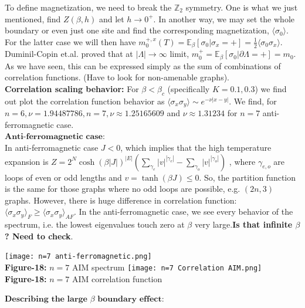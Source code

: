 \documentclass{article}
\begin{document}
	To define magnetization, we need to break the $\mathbb Z_2$ symmetry. One is what we just mentioned, find $Z(\beta,h)$ and let $h \to 0^{+}$. In another way, we may set the whole boundary or even just one site and find the corresponding magnetization, $\langle \sigma_0 \rangle$. For the latter case we will then have $m_0^{+,x}(T)=\mathbb{E_{\beta}}[\sigma_0 | \sigma_x=+]=\frac{1}{2}\langle \sigma_0 \sigma_x\rangle$. \\
	
	Duminil-Copin et.al. proved that at $|\Lambda| \to \infty$ limit, $m_0^{+}=\mathbb{E_{\beta}}[\sigma_0| \partial \Lambda=+]=m_0$. As we have seen, this can be expressed simply as the sum of combinations of correlation functions. (Have to look for non-amenable graphs).\\
	
	\textbf{Correlation scaling behavior:} For $\beta<\beta_c$ (specifically $K=0.1,0.3$) we find out plot the correlation function behavior as $\langle \sigma_x \sigma_y\rangle \sim e^{-\nu|x-y|}$. We find, for $n=6, \nu=1.94487786, n=7, \nu \approx 1.25165609$ and $\nu \approx 1.31234$ for $n=7$ anti-ferromagnetic case. \\
	
	
	$\textbf{Anti-ferromagnetic case:}$\\
	
	 In anti-ferromagnetic case $J<0$, which implies that the high temperature expansion is $Z=2^N\cosh(\beta |J|)^{|E|}(\sum_{\gamma_e} |v|^{|\gamma_e|}-\sum_{\gamma_o} |v|^{|\gamma_o|})$ , where $\gamma_{e,o}$ are loops of even or odd lengths and $v=\tanh(\beta J) \leq 0$. So, the partition function is the same for those graphs where no odd loops are possible, e.g. $(2n,3)$ graphs. However, there is huge difference in correlation function: $\langle \sigma_x \sigma_y \rangle_{F} \geq \langle \sigma_x \sigma_y \rangle_{AF}$. In the anti-ferromagnetic case, we see every behavior of the spectrum, i.e. the lowest eigenvalues touch zero at $\beta$ very large.\textbf{Is that infinite $\beta$? Need to check}.
	
	\begin{center}
		\texttt{[image: n=7 anti-ferromagnetic.png]}\\
		\textbf{Figure-18:} $n=7$ AIM spectrum
		\texttt{[image: n=7 Correlation AIM.png]}\\
		\textbf{Figure-18:} $n=7$ AIM correlation function
	
	\end{center}
	
	$\textbf{Describing the large $\beta$ boundary effect}$: \\

	
	
\end{document}

